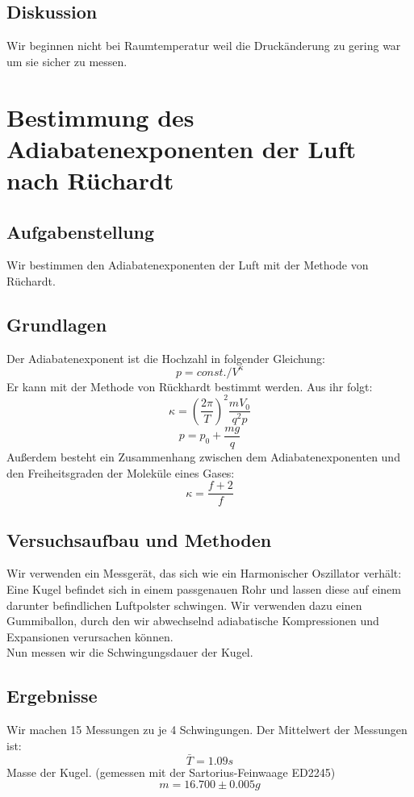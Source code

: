 \documentclass{article}
\begin{document}
\subsection{Diskussion}
Wir beginnen nicht bei Raumtemperatur weil die Druckänderung zu gering war um sie sicher zu messen. 
\newpage
\section{Bestimmung des Adiabatenexponenten der Luft nach Rüchardt}
\subsection{Aufgabenstellung}
Wir bestimmen den Adiabatenexponenten der Luft mit der Methode von Rüchardt.
\subsection{Grundlagen}
Der Adiabatenexponent ist die Hochzahl in folgender Gleichung:\\
$$p=const./V^{\kappa}$$
Er kann mit der Methode von Rückhardt bestimmt werden. Aus ihr folgt:
\begin{equation}
\label{kappa}
\kappa=(\frac{2\pi}{T})^2 \frac{mV_0}{q^2p}
\end{equation}
$$p=p_0+\frac{mg}{q}$$
Außerdem besteht ein Zusammenhang zwischen dem Adiabatenexponenten und den Freiheitsgraden der Moleküle eines Gases:
$$\kappa=\frac{f+2}{f}$$
\subsection{Versuchsaufbau und Methoden}
Wir verwenden ein Messgerät, das sich wie ein Harmonischer Oszillator verhält: Eine Kugel befindet sich in einem passgenauen Rohr und lassen diese auf einem darunter befindlichen Luftpolster schwingen. Wir verwenden dazu einen Gummiballon, durch den wir abwechselnd adiabatische Kompressionen und Expansionen verursachen können.\\
Nun messen wir die Schwingungsdauer der Kugel. 
\subsection{Ergebnisse}
Wir machen 15 Messungen zu je 4 Schwingungen. Der Mittelwert der Messungen ist:\\
$$\bar{T}=1.09s$$
Masse der Kugel. (gemessen mit der Sartorius-Feinwaage ED2245)\\
$$m=16.700\pm0.005g$$
\end{document}
